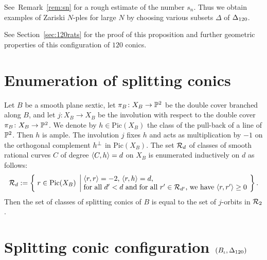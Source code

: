 \documentclass{amsart} %
\newcommand{\ps}{B}
\newcommand{\pips}{\pi_{\ps}}
\newcommand{\Xps}{X_{\ps}}
\newcommand{\Pic}{\mathrm{Pic}}
\begin{document}
%
%
See~Remark~\ref{rem:sn} 
for a rough estimate of the number $s_n$.
Thus we obtain examples of Zariski $N$-ples 
for large $N$ by choosing various subsets $\Delta$
of $\Delta_{120}$.
\par
%
See Section~\ref{sec:120rats} for the proof of this proposition and 
further geometric properties of this configuration of $120$ conics.
%
%
%
\section{Enumeration of splitting conics}\label{sec:enum}
%
Let $\ps$ be a smooth plane sextic,
 let $\pips\colon \Xps\to \PP^2$ be the double cover branched along $\ps$,
 and let $j\colon X_{\ps}\to X_{\ps}$ be the involution 
 with respect to the double cover $\pips\colon \Xps\to \PP^2$.
We denote by  $h\in  \Pic(\Xps)$   the class  of the pull-back of a line of $\mathord{\mathbb{P}}^2$.
Then $h$ is ample.
The involution $j$
fixes $h$ and acts as multiplication by $-1$
on the orthogonal complement $h^{\perp}$ in $ \Pic(\Xps)$.
The set $\mathord{\mathcal{R}}_d$ of classes of smooth rational curves $C$ of 
degree $\langle C, h \rangle=d$ on $X_{\ps}$ 
is  enumerated 
inductively on $d$ as follows:
\[
\RRR_d:=\bigset{r\in \Pic(X_{\ps})}
{\parbox{8cm}{$\intf{r, r}=-2$, $\intf{r, h}=d$, \\
for all $d\sprime<d$ and for all $r\sprime\in \RRR_{d\sprime}$, we have 
$\intf{r, r\sprime}\ge 0$}
}.
\]
Then the set of classes of splitting conics of $\ps$ is equal to 
the set of $j$-orbits in $\mathord{\mathcal{R}}_2$.
%
%
\section{Splitting conic configuration $(B_{\iota}, \Delta_{120})$}
\label{sec:A}
%
\end{document}
